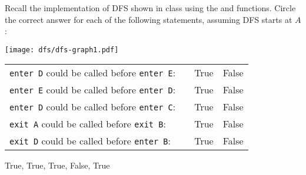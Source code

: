 \begin{cluster}
\label{grp:prb:examii-practice::enter-and-exit}

\begin{problem}
\label{prb:examii-practice::enter-and-exit}

Recall the implementation of DFS shown in class using the 
and  functions. Circle the correct answer for each of the
following statements, assuming DFS starts at $A$:

\begin{center}
  \texttt{[image: dfs/dfs-graph1.pdf]}
\end{center}

\bigskip
  \begin{tabular}{lp{1.3in}cc}
    \texttt{enter D} could be called before \texttt{enter E}:& &
    \textsf{True} & \textsf{False}\\[1.5 ex]
    \texttt{enter E} could be called before \texttt{enter D}:& & \textsf{True} & \textsf{False}\\[1.5 ex]
    \texttt{enter D} could be called before \texttt{enter C}:& & \textsf{True} & \textsf{False}\\[1.5 ex]
    \texttt{exit A} could be called before \texttt{exit B}: & & \textsf{True} & \textsf{False}\\[1.5 ex]
    \texttt{exit D} could be called before \texttt{enter B}:&  & \textsf{True} & \textsf{False}
  \end{tabular}

\sol
    True, True, True, False, True

\end{problem}
\end{cluster}

